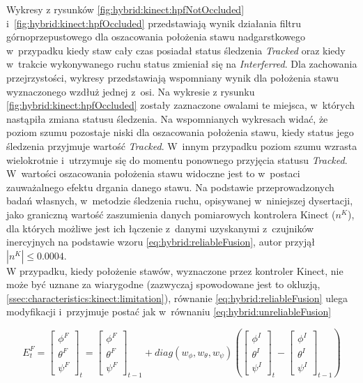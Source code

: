 Wykresy z rysunków \ref{fig:hybrid:kinect:hpfNotOccluded} i~\ref{fig:hybrid:kinect:hpfOccluded} przedstawiają wynik działania filtru górnoprzepustowego dla oszacowania położenia stawu nadgarstkowego w~przypadku kiedy staw cały czas posiadał status śledzenia \emph{Tracked} oraz kiedy w~trakcie wykonywanego ruchu status zmieniał się na \emph{Interferred}. Dla zachowania przejrzystości, wykresy przedstawiają wspomniany wynik dla położenia stawu wyznaczonego wzdłuż jednej z~osi. Na wykresie z rysunku \ref{fig:hybrid:kinect:hpfOccluded} zostały zaznaczone owalami te miejsca, w~których nastąpiła zmiana statusu śledzenia. Na wspomnianych wykresach widać, że poziom szumu pozostaje niski dla oszacowania położenia stawu, kiedy status jego śledzenia przyjmuje wartość \emph{Tracked}. W~innym przypadku poziom szumu wzrasta wielokrotnie i~utrzymuje się do momentu ponownego przyjęcia statusu  \emph{Tracked}. W~wartości oszacowania położenia stawu widoczne jest to w~postaci zauważalnego efektu drgania danego stawu. Na podstawie przeprowadzonych badań własnych, w~metodzie śledzenia ruchu, opisywanej w~niniejszej dysertacji, jako graniczną wartość zaszumienia danych pomiarowych kontrolera Kinect ($n^K$), dla których możliwe jest ich łączenie z~danymi uzyskanymi z~czujników inercyjnych na podstawie wzoru \ref{eq:hybrid:reliableFusion}, autor przyjął $|n^K| \le 0.0004$.\\

W przypadku, kiedy położenie stawów, wyznaczone przez kontroler Kinect, nie może być uznane za wiarygodne (zazwyczaj spowodowane jest to okluzją, \ref{ssec:characteristics:kinect:limitation}), równanie \ref{eq:hybrid:reliableFusion} ulega modyfikacji i~przyjmuje postać jak w~równaniu \ref{eq:hybrid:unreliableFusion} 

\begin{equation} 
	\label{eq:hybrid:unreliableFusion}
	E^F_t = 
	\begin{bmatrix}  \phi^F \\  \theta^F \\  \psi^F \end{bmatrix}_t = 
	\begin{bmatrix}  \phi^F \\  \theta^F \\  \psi^F \end{bmatrix}_{t-1} +
	diag(w_\phi,w_\theta,w_\psi)
	(\begin{bmatrix}  \phi^I \\  \theta^I \\  \psi^I \end{bmatrix}_t -
	\begin{bmatrix}  \phi^I \\  \theta^I \\  \psi^I \end{bmatrix}_{t-1})
\end{equation}


